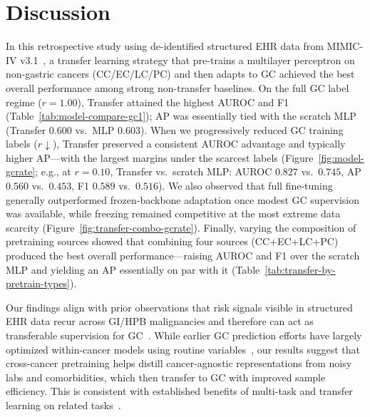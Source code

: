 \documentclass[diagnostics,article,submit,pdftex,moreauthors]{Definitions/mdpi}
\begin{document}
\section{Discussion}
In this retrospective study using de-identified structured EHR data from MIMIC-IV v3.1~\citep{Johnson2024MIMICIV}, a transfer learning strategy that pre-trains a multilayer perceptron on non-gastric cancers (CC/EC/LC/PC) and then adapts to GC achieved the best overall performance among strong non-transfer baselines. On the full GC label regime ($r{=}1.00$), Transfer attained the highest AUROC and F1 (Table~\ref{tab:model-compare-gc1}); AP was essentially tied with the scratch MLP (Transfer $0.600$ vs.\ MLP $0.603$).
When we progressively reduced GC training labels ($r\!\downarrow$), Transfer preserved a consistent AUROC advantage and typically higher AP—with the largest margins under the scarcest labels (Figure~\ref{fig:model-gcrate}; e.g., at $r{=}0.10$, Transfer vs.\ scratch MLP: AUROC $0.827$ vs.\ $0.745$, AP $0.560$ vs.\ $0.453$, F1 $0.589$ vs.\ $0.516$).
We also observed that full fine-tuning generally outperformed frozen-backbone adaptation once modest GC supervision was available, while freezing remained competitive at the most extreme data scarcity (Figure~\ref{fig:transfer-combo-gcrate}).
Finally, varying the composition of pretraining sources showed that combining four sources (CC+EC+LC+PC) produced the best overall performance—raising AUROC and F1 over the scratch MLP and yielding an AP essentially on par with it (Table~\ref{tab:transfer-by-pretrain-types}).

Our findings align with prior observations that risk signals visible in structured EHR data recur across GI/HPB malignancies and therefore can act as transferable supervision for GC~\citep{read2023cancers,Aksoy2019CBC,Krieg2024IDA,Kim2014GIBleed,Stein2016Anemia,Gkamprela2017CLDIDA,Crumley2010Albumin,Shimoyama2013DMGC,Yoon2013DMGC,Guo2022DMGC}. While earlier GC prediction efforts have largely optimized within-cancer models using routine variables~\citep{park2024SHapley,huang2022jco,Kim2024EHRGC}, our results suggest that cross-cancer pretraining helps distill cancer-agnostic representations from noisy labs and comorbidities, which then transfer to GC with improved sample efficiency. This is consistent with established benefits of multi-task and transfer learning on related tasks~\citep{Caruana1997_MTL,Pan2010_TLsurvey,Yosinski2014_transferable}.
\end{document}
